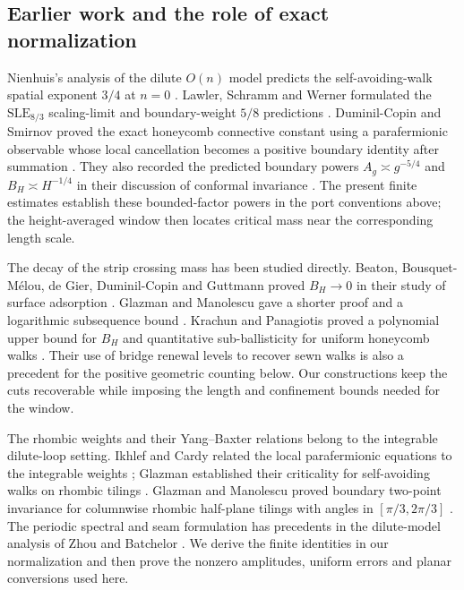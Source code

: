 \subsection{Earlier work and the role of exact normalization}
Nienhuis's analysis of the dilute $O(n)$ model predicts the
self-avoiding-walk spatial exponent $3/4$ at $n=0$
\cite{Nienhuis1982}. Lawler, Schramm and Werner formulated the
$\mathrm{SLE}_{8/3}$ scaling-limit and boundary-weight $5/8$ predictions
\cite[Sections~3.3--3.4 and~4.1]{LawlerSchrammWerner2004}.
Duminil-Copin and Smirnov proved the exact honeycomb connective constant
using a parafermionic observable whose local cancellation becomes a
positive boundary identity after summation
\cite{DuminilCopinSmirnov2012}. They also recorded the predicted boundary
powers $A_g\asymp g^{-5/4}$ and $B_H\asymp H^{-1/4}$ in their discussion
of conformal invariance \cite[Section~4]{DuminilCopinSmirnov2012}.
The present finite estimates establish these bounded-factor powers in
the port conventions above; the height-averaged window then locates
critical mass near the corresponding length scale.

The decay of the strip crossing mass has been studied directly.
Beaton, Bousquet-M\'elou, de Gier, Duminil-Copin and Guttmann proved
$B_H\to0$ in their study of surface adsorption
\cite[Theorem~10]{BeatonEtAl2014}. Glazman and Manolescu gave a shorter
proof and a logarithmic subsequence bound
\cite[Proposition~1.1]{GlazmanManolescu2017}. Krachun and Panagiotis
proved a polynomial upper bound for $B_H$ and quantitative
sub-ballisticity for uniform honeycomb walks
\cite[Theorems~1--2]{KrachunPanagiotis2026}. Their use of bridge renewal
levels to recover sewn walks is also a precedent for the positive
geometric counting below. Our constructions keep the cuts recoverable
while imposing the length and confinement bounds needed for the window.

The rhombic weights and their Yang--Baxter relations belong to the
integrable dilute-loop setting. Ikhlef and Cardy related the local
parafermionic equations to the integrable weights
\cite[Section~3]{IkhlefCardy2009}; Glazman established their criticality
for self-avoiding walks on rhombic tilings
\cite[Theorems~1.1--1.2]{Glazman2015}. Glazman and Manolescu proved
boundary two-point invariance for columnwise rhombic half-plane tilings
with angles in $[\pi/3,2\pi/3]$
\cite[Theorem~1]{GlazmanManolescu2017}. The periodic spectral and seam
formulation has precedents in the dilute-model analysis of Zhou and
Batchelor \cite[Section~2]{ZhouBatchelor1997}. We derive the finite
identities in our normalization and then prove the nonzero amplitudes,
uniform errors and planar conversions used here.

